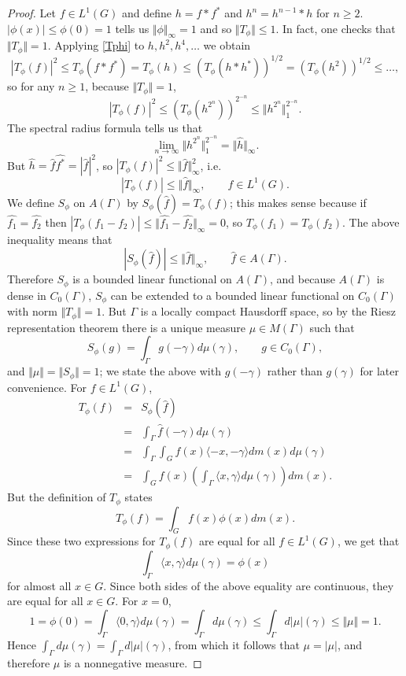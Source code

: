 \documentclass{article}
\newcommand{\inner}[2]{\langle #1, #2 \rangle}
\newcommand{\norm}[1]{\Vert #1 \Vert}
\begin{document}
\begin{proof}
Let $f \in L^1(G)$ 
and define $h=f*f^*$ and $h^n=h^{n-1}*h$ for $n \geq 2$. $|\phi(x)| \leq \phi(0)=1$ tells us $\norm{\phi}_\infty=1$ and so
$\norm{T_\phi} \leq 1$. In fact, one checks that $\norm{T_\phi}=1$. Applying \eqref{Tphi} to $h, h^2, h^4, \ldots$ we obtain
\[
|T_\phi(f)|^2 \leq T_\phi(f*f^*) = T_\phi(h) \leq (T_\phi (h*h^*))^{1/2} = (T_\phi(h^2))^{1/2} \leq \ldots,
\]
so for any $n \geq 1$, because $\norm{T_\phi} = 1$,
\[
|T_\phi(f)|^2 \leq (T_\phi(h^{2^n}))^{2^{-n}} \leq \norm{h^{2^n}}_1^{2^{-n}}. 
\]
The spectral radius formula tells us that 
\[
\lim_{n \to \infty} \norm{h^{2^n}}_1^{2^{-n}} = \norm{\hat{h}}_\infty.
\]
But $\hat{h} = \hat{f} \widehat{f^*}=|\hat{f}|^2$, so 
$|T_\phi(f)|^2 \leq \norm{ \hat{f}}_\infty^2$, i.e.
\[
|T_\phi(f)| \leq \norm{\hat{f}}_\infty, \qquad f \in L^1(G).
\]
We define $S_\phi$ on $A(\Gamma)$ by $S_\phi(\hat{f}) = T_\phi(f)$; this makes sense because if $\hat{f_1}=\hat{f_2}$ then
$|T_\phi(f_1-f_2)| \leq \norm{\hat{f_1}-\hat{f_2}}_\infty = 0$, so $T_\phi(f_1)=T_\phi(f_2)$. 
The above inequality means that
\[
|S_\phi(\hat{f})| \leq \norm{\hat{f}}_\infty, \qquad \hat{f} \in A(\Gamma).
\]
Therefore $S_\phi$ is a bounded linear functional on $A(\Gamma)$, and because $A(\Gamma)$ is dense in $C_0(\Gamma)$, 
$S_\phi$ can be extended to a bounded linear functional on $C_0(\Gamma)$ with norm $\norm{T_\phi} = 1$. 
But $\Gamma$ is a locally compact Hausdorff space, so by the Riesz representation theorem there is a unique measure
$\mu \in M(\Gamma)$ such that
\[
S_\phi(g) = \int_\Gamma g(-\gamma) d\mu(\gamma), \qquad g \in C_0(\Gamma),
\]
and $\norm{\mu}=\norm{S_\phi} = 1$; we state the above with $g(-\gamma)$ rather than $g(\gamma)$ for later convenience.
For $f \in L^1(G)$, 
\begin{eqnarray*}
T_\phi(f) &=& S_\phi(\hat{f})\\
&=& \int_\Gamma \hat{f}(-\gamma) d\mu(\gamma) \\
&=& \int_\Gamma \int_G f(x) \inner{-x}{-\gamma} dm(x) d\mu(\gamma)\\
&=&\int_G f(x) \left(\int_\Gamma \inner{x}{\gamma} d\mu(\gamma) \right) dm(x).
\end{eqnarray*}
But the definition of $T_\phi$ states
\[
T_\phi(f) = \int_G f(x) \phi(x) dm(x).
\]
Since these two expressions for $T_\phi(f)$ are equal for all $f \in L^1(G)$, we get that
\[
\int_\Gamma \inner{x}{\gamma} d\mu(\gamma)  = \phi(x)
\]
for almost all $x \in G$. Since both sides of the above equality are continuous, they are equal for all $x \in G$. 
For $x=0$, 
\[
1=\phi(0) = \int_\Gamma \inner{0}{\gamma} d\mu(\gamma) = \int_\Gamma d\mu(\gamma) \leq \int_\Gamma d|\mu|(\gamma)
\leq \norm{\mu}=1.
\]
Hence $\int_\Gamma d\mu(\gamma) = \int_\Gamma d|\mu|(\gamma)$, from which it follows that $\mu=|\mu|$, and therefore
$\mu$ is a nonnegative measure.
\end{proof}
\end{document}
